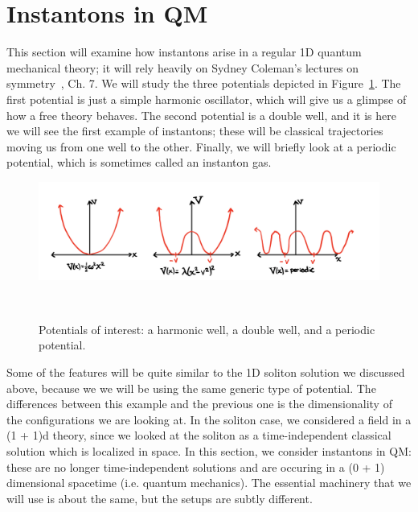 \documentclass[11pt, oneside]{article}   	%
\theoremstyle{definition}
\begin{document}
\newpage
\section{Instantons in QM}

This section will examine how instantons arise in a regular 1D quantum mechanical theory; it will rely heavily on Sydney Coleman's 
lectures on symmetry~\cite{coleman_instantons}, Ch. 7. We will study the three potentials depicted in 
Figure~\ref{fig:instanton_potentials}. The first potential is just a simple harmonic oscillator, which will 
give us a glimpse of how a free theory behaves. The second potential is a double well, and it is here we will see the first example of 
instantons; these will be classical trajectories moving us from one well to the other. Finally, we will briefly look at a periodic potential, 
which is sometimes called an instanton gas. 
\begin{figure}[H]
	\centering
	\includegraphics[width = .9\textwidth]{instanton_potentials}
	\caption{Potentials of interest: a harmonic well, a double well, and a periodic potential.}~
	\label{fig:instanton_potentials}
\end{figure}
Some of the features will be quite similar to the 1D soliton solution we discussed above, because we we will be using the same 
generic type of potential. The differences between this example and the previous one is the dimensionality of the configurations we are looking at. 
In the soliton case, we considered a field in a (1 + 1)d theory, since we looked at the soliton as a time-independent classical solution 
which is localized in space. In this section, we consider instantons in QM: these are no longer time-independent solutions and are 
occuring in a (0 + 1) dimensional spacetime (i.e. quantum mechanics). The essential machinery that we will use is about the same, 
but the setups are subtly different. 
\end{document}

